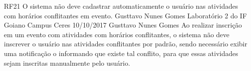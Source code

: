   \requisitoFuncional
 {RF21}
 {O sistema não deve cadastrar automaticamente o usuário nas atividades com horários conflitantes em evento.}
 {Gusttavo Nunes Gomes}
 {Laboratório 2 do IF Goiano Campus Ceres}
 {10/10/2017}
 {Gusttavo Nunes Gomes}
 { Ao realizar inscrição em um evento com atividades com horários conflitantes, o sistema não deve inscrever o usuário nas atividades conflitantes por padrão, sendo necessário exibir uma notificação o informando que existe tal conflito, para que essas atividades sejam inscritas manualmente pelo usuário.
 }
